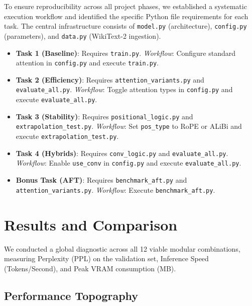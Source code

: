 \documentclass[11pt,a4paper]{article}
\begin{document}
To ensure reproducibility across all project phases, we established a systematic execution workflow and identified the specific Python file requirements for each task. The central infrastructure consists of \texttt{model.py} (architecture), \texttt{config.py} (parameters), and \texttt{data.py} (WikiText-2 ingestion).

\begin{itemize}
    \item \textbf{Task 1 (Baseline)}: Requires \texttt{train.py}. \textit{Workflow}: Configure standard attention in \texttt{config.py} and execute \texttt{train.py}.
    \item \textbf{Task 2 (Efficiency)}: Requires \texttt{attention\_variants.py} and \texttt{evaluate\_all.py}. \textit{Workflow}: Toggle attention types in \texttt{config.py} and execute \texttt{evaluate\_all.py}.
    \item \textbf{Task 3 (Stability)}: Requires \texttt{positional\_logic.py} and \texttt{extrapolation\_test.py}. \textit{Workflow}: Set \texttt{pos\_type} to RoPE or ALiBi and execute \texttt{extrapolation\_test.py}.
    \item \textbf{Task 4 (Hybrids)}: Requires \texttt{conv\_logic.py} and \texttt{evaluate\_all.py}. \textit{Workflow}: Enable \texttt{use\_conv} in \texttt{config.py} and execute \texttt{evaluate\_all.py}.
    \item \textbf{Bonus Task (AFT)}: Requires \texttt{benchmark\_aft.py} and \texttt{attention\_variants.py}. \textit{Workflow}: Execute \texttt{benchmark\_aft.py}.
\end{itemize}

\section{Results and Comparison}

We conducted a global diagnostic across all 12 viable modular combinations, measuring Perplexity (PPL) on the validation set, Inference Speed (Tokens/Second), and Peak VRAM consumption (MB).

\subsection{Performance Topography}
\end{document}
